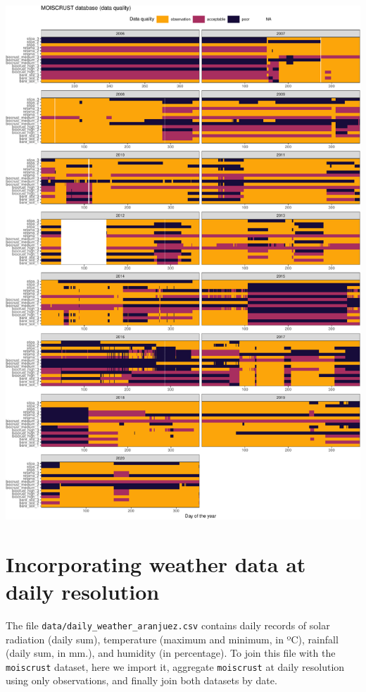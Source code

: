 \documentclass[
  table]{article}
\begin{document}
\includegraphics{moiscrust_files/figure-latex/unnamed-chunk-30-1.pdf}

\hypertarget{incorporating-weather-data-at-daily-resolution}{%
\section{Incorporating weather data at daily
resolution}\label{incorporating-weather-data-at-daily-resolution}}

The file \texttt{data/daily\_weather\_aranjuez.csv} contains daily
records of solar radiation (daily sum), temperature (maximum and
minimum, in ºC), rainfall (daily sum, in mm.), and humidity (in
percentage). To join this file with the \texttt{moiscrust} dataset, here
we import it, aggregate \texttt{moiscrust} at daily resolution using
only observations, and finally join both datasets by date.
\end{document}
